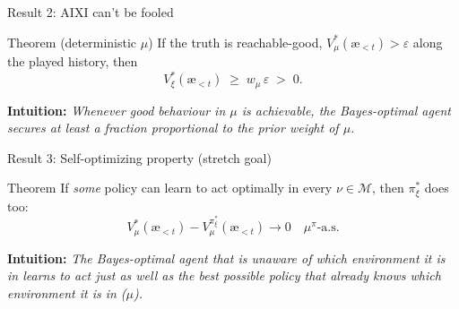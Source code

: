 \documentclass[10pt,aspectratio=169]{beamer}
\newcommand{\cM}{\mathcal{M}}
\newcommand{\aes}{{\text{\ae}}}            %
\begin{document}
\begin{frame}{Result 2: AIXI can't be fooled}
\begin{block}{Theorem (deterministic $\mu$)}
If the truth is reachable-good, $V_\mu^*(\aes_{<t}) > \varepsilon$ along the played history, then
\[
V_\xi^*(\aes_{<t}) \;\geq\; w_\mu\,\varepsilon \;>\; 0 .
\]
\end{block}
\pause
\textbf{Intuition:} \emph{Whenever good behaviour in $\mu$ is achievable,
the Bayes-optimal agent secures at least a fraction proportional to the prior weight of $\mu$.}
\end{frame}

\begin{frame}{Result 3: Self-optimizing property (stretch goal)}
\begin{block}{Theorem}
If \emph{some} policy can learn to act optimally in every $\nu\in\cM$, then $\pi_\xi^*$ does too:
\[
V_\mu^*(\aes_{<t}) - V_\mu^{\pi_\xi^*}(\aes_{<t}) \to 0 \quad \mu^\pi\text{-a.s.}
\]
\end{block}
\pause
\textbf{Intuition:} \emph{The Bayes-optimal agent that is unaware of which environment it is in learns to act
just as well as the best possible policy that already knows which environment it is in ($\mu$).}
\end{frame}
\end{document}
